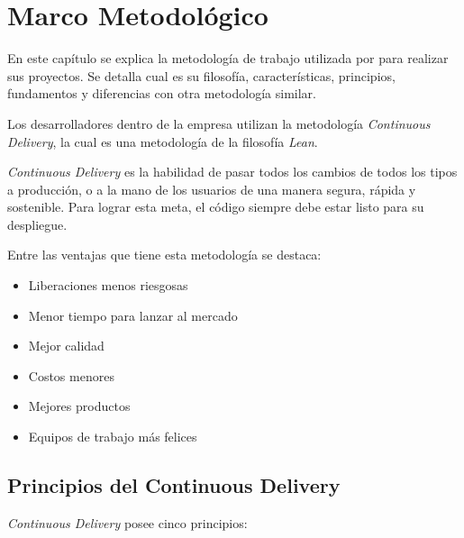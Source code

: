 \chapter{Marco Metodológico}

En este capítulo se explica la metodología de trabajo utilizada por \business para realizar sus proyectos. Se detalla cual es su filosofía, características, principios, fundamentos y diferencias con otra metodología similar.

Los desarrolladores dentro de la empresa utilizan la metodología \textit{Continuous Delivery}, la cual es una metodología de la filosofía \textit{Lean}.

\textit{Continuous Delivery} es la habilidad de pasar todos los cambios de todos los tipos a producción, o a la mano de los usuarios de una manera segura, rápida y sostenible. Para lograr esta meta, el código siempre debe estar listo para su despliegue.

Entre las ventajas que tiene esta metodología se destaca:

\begin{itemize}
    \item Liberaciones menos riesgosas
    \item Menor tiempo para lanzar al mercado
    \item Mejor calidad
    \item Costos menores
    \item Mejores productos
    \item Equipos de trabajo más felices
\end{itemize}

\section{Principios del Continuous Delivery}

\textit{Continuous Delivery} posee cinco principios:

